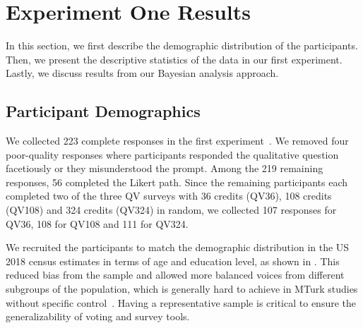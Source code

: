 \section{Experiment One Results} \label{results-1-quan}
In this section, we first describe the demographic distribution of the participants. Then, we present the descriptive statistics of the data in our first experiment. Lastly, we discuss results from our Bayesian analysis approach.

\subsection{Participant Demographics}
We collected 223 complete responses in the first experiment~\cite{illinoisdatabankIDB_1928463}.  We removed four poor-quality responses where participants responded the qualitative question facetiously or they misunderstood the prompt. Among the 219 remaining responses, 56 completed the Likert path. Since the remaining participants each completed two of the three QV surveys with 36 credits (QV36), 108 credits (QV108) and 324 credits (QV324) in random, we collected 107 responses for QV36, 108 for QV108 and 111 for QV324. 
{}

We recruited the participants to match the demographic distribution in the US 2018 census estimates in terms of age and education level, as shown in . This reduced bias from the sample and allowed more balanced voices from different subgroups of the population, which is generally hard to achieve in MTurk studies without specific control~\cite{difallah2018demographics}. Having a representative sample is critical to ensure the generalizability of voting and survey tools. 

